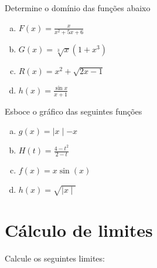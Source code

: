 \documentclass[12pt]{exam}
\begin{document}
\begin{questions}
\question Determine o domínio das funções abaixo
    \begin{multicols}{2}
        \begin{enumerate}[(a)]
            \item 
            $\displaystyle F(x) =  \frac{x}{x^2 + 5x + 6} $
            \item 
            $\displaystyle G(x) =  \sqrt[3]{x} \left( 1 + x^3 \right)  $
            \item 
            $\displaystyle R(x) =  x^2 + \sqrt{2x -1} $
            \item 
            $\displaystyle h(x) =  \frac{\sin{x}}{x + 1}$

        \end{enumerate}
    \end{multicols}
    
    

\question Esboce o gráfico das seguintes funções
    \begin{multicols}{2}
        \begin{enumerate}[(a)]
            \item 
            $\displaystyle g(x) = \mid x\mid - x$
            \item 
            $\displaystyle H(t) = \frac{4 - t^2}{2 - t} $
            \item 
            $\displaystyle f(x) = x\sin{\left(x\right)}$
            \item 
            $\displaystyle h(x) = \sqrt{\mid x \mid}$
        \end{enumerate}
    \end{multicols}


\section{Cálculo de limites}



\question Calcule os seguintes limites:
    

\end{questions}
\end{document}

